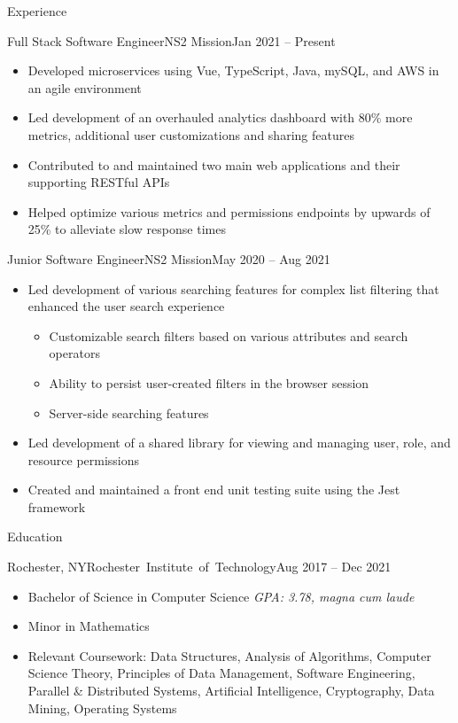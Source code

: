 \documentclass[]{mcdowellcv}
\begin{document}
	\makeheader
	
	\begin{cvsection}{Experience}
		\begin{cvsubsection}{Full Stack Software Engineer}{NS2 Mission}{Jan 2021 -- Present}	
			\begin{itemize}
				\item Developed microservices using Vue, TypeScript, Java, mySQL, and AWS in an agile environment
				\item Led development of an overhauled analytics dashboard with 80\% more metrics, additional user customizations and sharing features
				\item Contributed to and maintained two main web applications and their supporting RESTful APIs
				\item Helped optimize various metrics and permissions endpoints by upwards of 25\% to alleviate slow response times
			\end{itemize}
		\end{cvsubsection}

		\begin{cvsubsection}{Junior Software Engineer}{NS2 Mission}{May 2020 -- Aug 2021}	
			\begin{itemize}
				\item Led development of various searching features for complex list filtering that enhanced the user search experience
				\begin{itemize}
					\item Customizable search filters based on various attributes and search operators
					\item Ability to persist user-created filters in the browser session
					\item Server-side searching features
				\end{itemize}
				\item Led development of a shared library for viewing and managing user, role, and resource permissions
				\item Created and maintained a front end unit testing suite using the Jest framework
			\end{itemize}
		\end{cvsubsection}
	\end{cvsection}
	
	\begin{cvsection}{Education}
		\begin{cvsubsection}{Rochester, NY}{\mbox{Rochester Institute of Technology}}{Aug 2017 -- Dec 2021}
			\begin{itemize}
				\item Bachelor of Science in Computer Science \hfill \textit{GPA: 3.78, magna cum laude}
				\item Minor in Mathematics
				\item Relevant Coursework: Data Structures, Analysis of Algorithms, Computer Science Theory, Principles of Data Management, Software Engineering, Parallel \& Distributed Systems, Artificial Intelligence, 
				Cryptography, Data Mining, Operating Systems
			\end{itemize}
		\end{cvsubsection}
	\end{cvsection}
\end{document}
